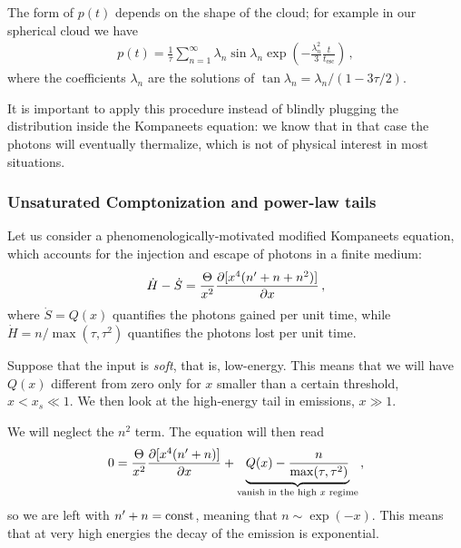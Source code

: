 \documentclass[main.tex]{subfiles}
\begin{document}
The form of \(p(t)\) depends on the shape of the cloud; for example in our spherical cloud we have 
%
\begin{align}
p(t) = \frac{1}{\tau } \sum _{n=1}^{\infty } \lambda_n \sin \lambda_n \exp( - \frac{\lambda _n^2}{3} \frac{t}{ t _{\text{esc}}}) 
\,,
\end{align}
%
where the coefficients \(\lambda _n\) are the solutions of \(\tan \lambda _n  = \lambda _n / (1 - 3 \tau / 2)\). 

It is important to apply this procedure instead of blindly plugging the distribution inside the Kompaneets equation: we know that in that case the photons will eventually thermalize, which is not of physical interest in most situations. 

\subsubsection{Unsaturated Comptonization and power-law tails}

Let us consider a phenomenologically-motivated modified Kompaneets equation, which accounts for the injection and escape of photons in a finite medium: 
%
\begin{align}
\dot{H} - \dot{S} = \frac{\Theta}{x^2} \pdv{[x^{4} (n' + n + n^2)]}{x}
\,,
\end{align}
%
where \(\dot{S} = Q(x)\) quantifies the photons gained per unit time, while \(\dot{H} = n / \max(\tau , \tau^2)\) quantifies the photons lost per unit time.



Suppose that the input is \emph{soft}, that is, low-energy. 
This means that we will have \(Q(x)\) different from zero only for \(x\) smaller than a certain threshold, \(x< x_s \ll 1\). 
We then look at the high-energy tail in emissions, \(x \gg 1\).

We will neglect the \(n^2\) term. The equation  will then read 
%
\begin{align}
0 = \frac{\Theta}{x^2} \pdv{[x^{4}(n' + n)]}{x} + \underbrace{Q(x) - \frac{n}{\max (\tau , \tau^2)}}_{\text{vanish in the high \(x\) regime}}
\,,
\end{align}
%
so we are left with \(n' + n = \text{const}\), meaning that \(n \sim \exp(- x)\). 
This means that at very high energies the decay of the emission is exponential.
\end{document}
